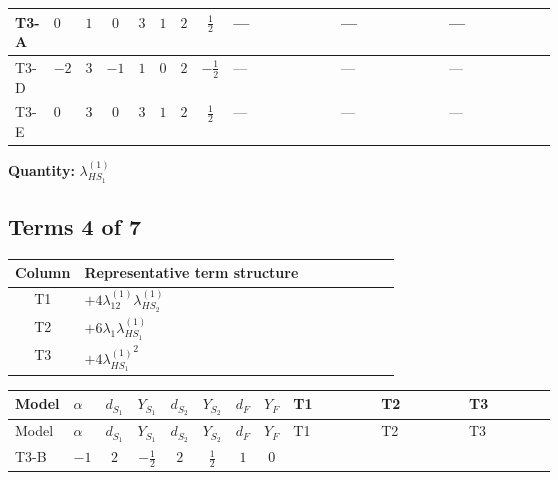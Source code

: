 \documentclass[8pt]{article}
\begin{document}
\begin{landscape}
\begin{longtable}{@{}llcccccc >{\raggedright\arraybackslash}p{0.21\linewidth} >{\raggedright\arraybackslash}p{0.21\linewidth} >{\raggedright\arraybackslash}p{0.21\linewidth}@{}}
\midrule
T3-A & $0$ & $1$ & $0$ & $3$ & $1$ & $2$ & $\frac{1}{2}$ & --- & --- & --- \\
\midrule
T3-D & $-2$ & $3$ & $-1$ & $1$ & $0$ & $2$ & $-\frac{1}{2}$ & --- & --- & --- \\
\midrule
T3-E & $0$ & $3$ & $0$ & $3$ & $1$ & $2$ & $\frac{1}{2}$ & --- & --- & --- \\
\midrule
\bottomrule
\end{longtable}
\clearpage
\noindent\textbf{Quantity: }$\lambda_{HS_1}^{(1)}$\par\smallskip
\subsection*{Terms 4 of 7}
\begin{center}
\begin{tabular}{@{}c >{\raggedright\arraybackslash}p{0.82\linewidth}@{}}
\toprule
Column & Representative term structure \\
\midrule
T1 & \(\displaystyle +4 {\lambda_{12}^{(1)}} {\lambda_{HS_2}^{(1)}}\) \\
\midrule
T2 & \(\displaystyle +6 {\lambda_1} {\lambda_{HS_1}^{(1)}}\) \\
\midrule
T3 & \(\displaystyle +4 {\lambda_{HS_1}^{(1)}}^2\) \\
\midrule
\bottomrule
\end{tabular}
\end{center}
\smallskip
\tiny
\begin{longtable}{@{}llcccccc >{\raggedright\arraybackslash}p{0.21\linewidth} >{\raggedright\arraybackslash}p{0.21\linewidth} >{\raggedright\arraybackslash}p{0.21\linewidth}@{}}
\toprule
Model & $\alpha$ & $d_{S_1}$ & $Y_{S_1}$ & $d_{S_2}$ & $Y_{S_2}$ & $d_F$ & $Y_F$ & T1 & T2 & T3 \\
\midrule
\endfirsthead
\toprule
Model & $\alpha$ & $d_{S_1}$ & $Y_{S_1}$ & $d_{S_2}$ & $Y_{S_2}$ & $d_F$ & $Y_F$ & T1 & T2 & T3 \\
\midrule
\endhead
T3-B & $-1$ & $2$ & $-\frac{1}{2}$ & $2$ & $\frac{1}{2}$ & $1$ & $0$ & \scriptsize\adjustbox{max width=\linewidth}{$\begin{gathered} +4 {\lambda_{12}^{(1)}} {\lambda_{HS_2}^{(1)}}\end{gathered}$} & \scriptsize\adjustbox{max width=\linewidth}{$\begin{gathered} +6 {\lambda_1} {\lambda_{HS_1}^{(1)}}\end{gathered}$} & \scriptsize\adjustbox{max width=\linewidth}{$\begin{gathered} +4 {\lambda_{HS_1}^{(1)}}^2\end{gathered}$} \\

\end{longtable}
\end{landscape}
\end{document}
